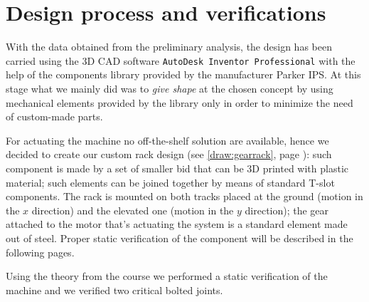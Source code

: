 \section{Design process and verifications}
	With the data obtained from the preliminary analysis, the design has been carried using the 3D CAD software \texttt{AutoDesk Inventor Professional} with the help of the components library provided by the manufacturer Parker IPS. At this stage what we mainly did was to \textit{give shape} at the chosen concept by using mechanical elements provided by the library only in order to minimize the need of custom-made parts.
	
	For actuating the machine no off-the-shelf solution are available, hence we decided to create our custom rack design (see \ref{draw:gearrack}, page \pageref{draw:gearrack}): such component is made by a set of smaller bid that can be 3D printed with plastic material; such elements can be joined together by means of standard T-slot components. The rack is mounted on both tracks placed at the ground (motion in the $x$ direction) and the elevated one (motion in the $y$ direction); the gear attached to the motor that's actuating the system is a standard element made out of steel. Proper static verification of the component will be described in the following pages.
	
	Using the theory from the course we performed a static verification of the machine and we verified two critical bolted joints.
	
	
	
	
	
